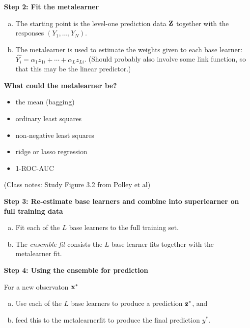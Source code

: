 \documentclass[
  ignorenonframetext,
]{beamer}
\providecommand{\tightlist}{%
  \setlength{\itemsep}{0pt}\setlength{\parskip}{0pt}}
\begin{document}
\begin{frame}
\textbf{Step 2: Fit the metalearner}

\begin{enumerate}
[a)]
\tightlist
\item
  The starting point is the level-one prediction data \({\bf Z}\)
  together with the responses \((Y_1,\ldots ,Y_N)\).
\item
  The metalearner is used to estimate the weights given to each base
  learner: \(\hat{Y_i}=\alpha_1 z_{1i}+ \cdots + \alpha_L z_{Li}\).
  (Should probably also involve some link function, so that this may be
  the linear predictor.)
\end{enumerate}

\textbf{What could the metalearner be?}
\end{frame}

\begin{frame}
\begin{itemize}
\tightlist
\item
  the mean (bagging)
\item
  ordinary least squares
\item
  non-negative least squares
\item
  ridge or lasso regression
\item
  1-ROC-AUC
\end{itemize}
\end{frame}

\begin{frame}
(Class notes: Study Figure 3.2 from Polley et al)
\end{frame}

\begin{frame}
\textbf{Step 3: Re-estimate base learners and combine into superlearner
on full training data}

\begin{enumerate}
[a)]
\tightlist
\item
  Fit each of the \(L\) base learners to the full training set.
\item
  The \emph{ensemble fit} consists the \(L\) base learner fits together
  with the metalearner fit.
\end{enumerate}

\textbf{Step 4: Using the ensemble for prediction}

For a new observaton \({\bf x}^*\)

\begin{enumerate}
[a)]
\tightlist
\item
  Use each of the \(L\) base learners to produce a prediction
  \({\bf z}^*\), and
\item
  feed this to the metalearnerfit to produce the final prediction
  \(y^*\).
\end{enumerate}
\end{frame}
\end{document}
